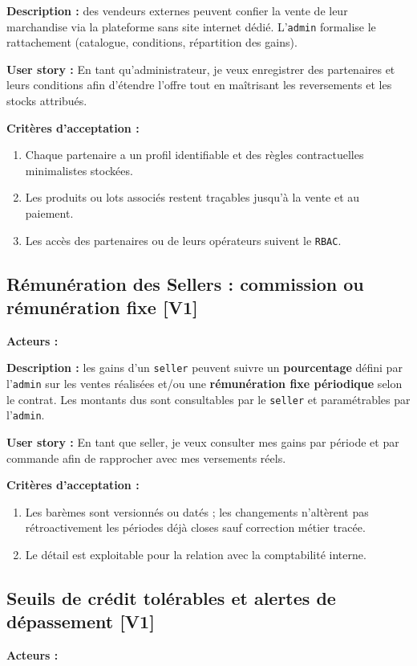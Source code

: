 \documentclass[11pt,a4paper]{scrreprt}
\newcommand{\code}[1]{\texttt{#1}}
\newcommand{\phase}[1]{\textbf{\textcolor{SplinAmber}{#1}}}
\newcommand{\actorbadge}[1]{\highlight{\code{#1}}}
\begin{document}
\textbf{Description :} des vendeurs externes peuvent confier la vente de leur marchandise via la plateforme sans site internet dédié. L'\code{admin} formalise le rattachement (catalogue, conditions, répartition des gains).

\textbf{User story :} En tant qu'administrateur, je veux enregistrer des partenaires et leurs conditions afin d'étendre l'offre tout en maîtrisant les reversements et les stocks attribués.

\textbf{Critères d'acceptation :}
\begin{enumerate}
  \item Chaque partenaire a un profil identifiable et des règles contractuelles minimalistes stockées.
  \item Les produits ou lots associés restent traçables jusqu'à la vente et au paiement.
  \item Les accès des partenaires ou de leurs opérateurs suivent le \code{RBAC}.
\end{enumerate}

\subsection{Rémunération des Sellers : commission ou rémunération fixe \phase{[V1]}}
\textbf{Acteurs :} \actorbadge{ADMIN} \actorbadge{SELLER}

\textbf{Description :} les gains d'un \code{seller} peuvent suivre un \textbf{pourcentage} défini par l'\code{admin} sur les ventes réalisées et/ou une \textbf{rémunération fixe périodique} selon le contrat. Les montants dus sont consultables par le \code{seller} et paramétrables par l'\code{admin}.

\textbf{User story :} En tant que seller, je veux consulter mes gains par période et par commande afin de rapprocher avec mes versements réels.

\textbf{Critères d'acceptation :}
\begin{enumerate}
  \item Les barèmes sont versionnés ou datés ; les changements n'altèrent pas rétroactivement les périodes déjà closes sauf correction métier tracée.
  \item Le détail est exploitable pour la relation avec la comptabilité interne.
\end{enumerate}

\subsection{Seuils de crédit tolérables et alertes de dépassement \phase{[V1]}}
\textbf{Acteurs :} \actorbadge{ADMIN} \actorbadge{SYSTEM}
\end{document}
